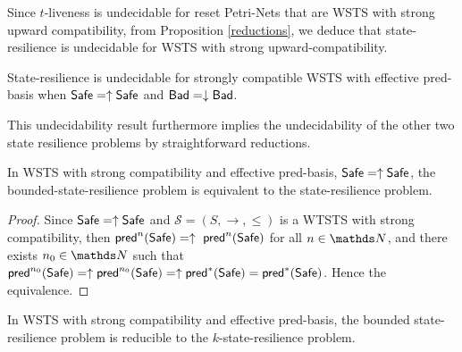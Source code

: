 \iffalse

\begin{theorem}
The downward reachability problem is reducible to the state resilience problem.
\end{theorem}

\begin{proof}
Let $s \in S$, and a downward-closed set $D$. \alain{je ne comprends pas cette "preuve"}
Take $\Safe = \emptyset$ and $\Bad = D$.
The state resilience problem on $\Safe,\Bad$ asks
whether $\Bad \cap \post^*(s) \rightarrow^* \Safe$  that is equivalent to $\Bad \cap \post^*(s) \subseteq \emptyset$.
If the answer is negative then $s \to^* \Bad$,
else $s \not\to^* \Bad$.
\end{proof}

\fi


Since $t$-liveness is undecidable for reset Petri-Nets that are WSTS with strong upward compatibility, from Proposition \ref{reductions},  we deduce that state-resilience is undecidable for WSTS with strong upward-compatibility.

\begin{theorem}\label{srp up down}
{\sc State-resilience} is undecidable for strongly compatible WSTS with effective pred-basis
when
$\textsf{Safe}=\uparrow \textsf{Safe}$
and $\textsf{Bad}=\downarrow \textsf{Bad}$.
\end{theorem}


This undecidability result furthermore implies the undecidability of the other two state resilience problems by straightforward reductions.


\begin{proposition}
In WSTS with strong compatibility and effective pred-basis,  $\textsf{Safe}=\uparrow \textsf{Safe}$, the bounded-state-resilience problem is equivalent to the state-resilience problem.
\end{proposition}

\begin{proof}
Since $\textsf{Safe}=\uparrow \textsf{Safe}$ and
$\mathscr{S}=(S,\rightarrow,\leq)$ is a WTSTS with strong %
compatibility, then $\textsf{pred}^n(\textsf{Safe})= \uparrow~\textsf{pred}^n(\textsf{Safe})$ for all $n \in \N$,
and there exists $n_0 \in \N$ such that 
$\textsf{pred}^{n_0}(\textsf{Safe}) = \uparrow \textsf{pred}^{n_0}(\textsf{Safe}) = \uparrow \textsf{pred}^*(\textsf{Safe}) = \textsf{pred}^*(\textsf{Safe})$.
Hence the equivalence.
\end{proof}

\begin{proposition}
In WSTS with strong compatibility and effective pred-basis, the bounded state-resilience problem is
reducible to the $k$-state-resilience problem.
\end{proposition}

